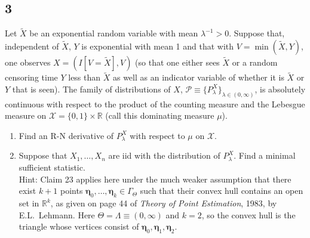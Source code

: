 \documentclass[12pt]{article}
\begin{document}
\newpage


\subsection*{3}
\begin{tcolorbox}
Let $\tilde{X}$ be an exponential random variable with mean $\lambda^{-1}>0$.    Suppose that, independent of $\tilde{X}$, $Y$ is exponential with mean 1
and that with $V = \min(\tilde{X},Y)$, one observes $X=(I[V=\tilde{X}],V)$ (so that one either sees $\tilde{X}$ or a random censoring time $Y$
less than $\tilde{X}$ as well as an indicator variable of whether it is $\tilde{X}$ or $Y$ that is seen).
The family of distributions of $X$, $\mathcal{P}\equiv \{P^X_\lambda\}_{\lambda \in (0,\infty)}$, is absolutely continuous with respect to the
product of the counting measure and the Lebesgue measure on $\mathcal{X}=\{0,1\}\times \mathbb{R}$ (call this dominating measure $\mu$).
\begin{enumerate}
  \item Find an R-N derivative of $P_\lambda^X$ with respect to $\mu$ on $\mathcal{X}$.
  \item Suppose that $X_1,\ldots,X_n$ are iid with the distribution of $P_\lambda^X$.  Find a minimal sufficient statistic. \\
    Hint: Claim 23 applies here under the much weaker assumption that there exist $k+1$ points $\bm{\eta}_0,\ldots,\bm{\eta}_k\in \Gamma_\Theta$ such
    that their convex hull contains an open set in $\mathbb{R}^k$, as given on page 44 of {\it Theory of Point Estimation}, 1983, by E.L.~Lehmann.  Here $\Theta=\Lambda \equiv (0,\infty)$ and $k=2$, so the convex hull is the triangle whose vertices consist of $\bm{\eta}_0,\bm{\eta}_1,\bm{\eta}_2$.
\end{enumerate}
\end{tcolorbox}
\end{document}
